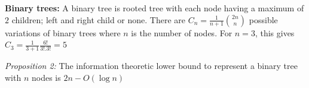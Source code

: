 \textbf{Binary trees:} A binary tree is rooted tree with each node having a maximum of $2$ children; left and right child or none. There are $C_n = \frac{1}{n+1} \binom{2n}{n}$ possible variations of binary trees where $n$ is the number of nodes. For $n = 3$, this gives $C_3 = \frac{1}{3+1} \frac{6!}{3!.3!} = 5$\par
\textit{Proposition 2:} The information theoretic lower bound to represent a binary tree with $n$ nodes is $2n - O(\log n)$\par




